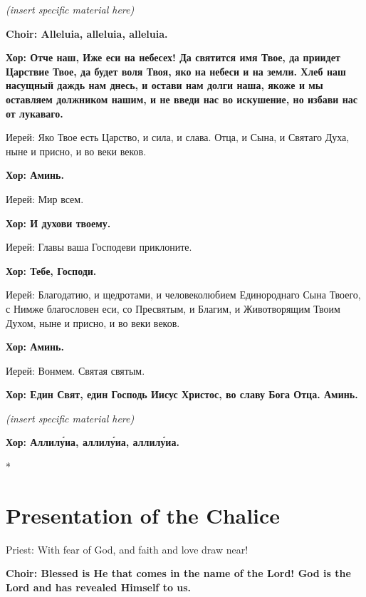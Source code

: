 \documentclass[12pt,a4paper,titlepage]{report}
\begin{document}
\begin{paracol}[1]{2}
	\textit {(insert specific material here)}
	
    \textbf{Choir: Alleluia, alleluia, alleluia.}

	\switchcolumn[1]
	
	\textbf{Хор: Отче наш, Иже еси на небесех! Да святится имя Твое, да приидет Царствие Твое, да будет воля Твоя, яко на небеси и на земли. Хлеб наш насущный даждь нам днесь, и остави нам долги наша, якоже и мы оставляем должником нашим, и не введи нас во искушение, но избави нас от лукаваго.}
	
	Иерей: Яко Твое есть Царство, и сила, и слава. Отца, и Сына, и Святаго Духа, ныне и присно, и во веки веков.
	
	\textbf{Хор: Аминь.}
	
	Иерей: Мир всем.
	
	\textbf{Хор: И духови твоему.}
	
	Иерей: Главы ваша Господеви приклоните.
	
	\textbf{Хор: Тебе, Господи.}
	
	Иерей: Благодатию, и щедротами, и человеколюбием Единороднаго Сына Твоего, с Нимже благословен еси, со Пресвятым, и Благим, и Животворящим Твоим Духом, ныне и присно, и во веки веков.
	
	\textbf{Хор: Аминь.}
	
	Иерей: Вонмем. Святая святым.
	
	\textbf{Хор: Един Свят, един Господь Иисус Христос, во славу Бога Отца. Аминь.}
	
	\textit {\foreignlanguage{english}{(insert specific material here)}}
	
	\textbf{Хор: Аллилу́иа, аллилу́иа, аллилу́иа.}

	\switchcolumn[0]*

    \section*{Presentation of the Chalice}

	Priest: With fear of God, and faith and love draw near!

    \textbf{Choir: Blessed is He that comes in the name of the Lord! God is the Lord and has revealed Himself to us.}
	

\end{paracol}
\end{document}
